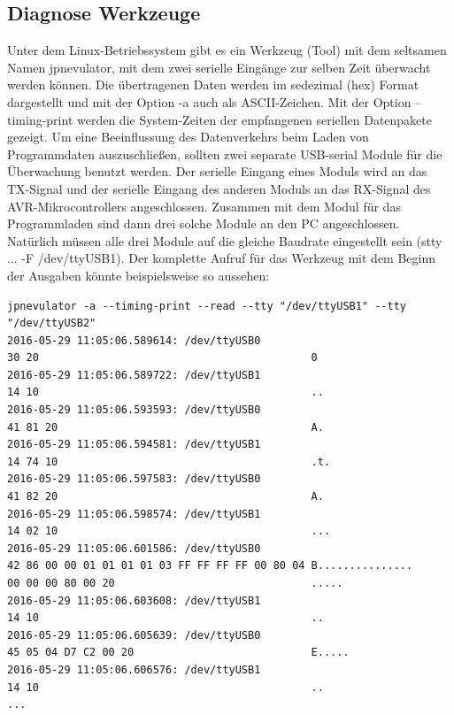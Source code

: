 \subsection{Diagnose Werkzeuge}
Unter dem Linux-Betriebssystem gibt es ein Werkzeug (Tool) mit dem seltsamen Namen jpnevulator, mit dem
zwei serielle Eingänge zur selben Zeit überwacht werden können.
Die übertragenen Daten werden im sedezimal (hex) Format dargestellt und mit der Option -a auch als ASCII-Zeichen.
Mit der Option --timing-print werden die System-Zeiten der empfangenen seriellen Datenpakete gezeigt.
Um eine Beeinflussung des Datenverkehrs beim Laden von Programmdaten auszuschließen, sollten
zwei separate USB-serial Module für die Überwachung benutzt werden.
Der serielle Eingang eines Moduls wird an das TX-Signal und der serielle Eingang des anderen Moduls
an das RX-Signal des AVR-Mikrocontrollers angeschlossen.
Zusammen mit dem Modul für das Programmladen sind dann drei solche Module an den PC angeschlossen.
Natürlich müssen alle drei Module auf die gleiche Baudrate eingestellt sein (stty ... -F /dev/ttyUSB1).
Der komplette Aufruf für das Werkzeug mit dem Beginn der Ausgaben könnte beispielsweise so aussehen:
\begin{verbatim}
jpnevulator -a --timing-print --read --tty "/dev/ttyUSB1" --tty "/dev/ttyUSB2"
2016-05-29 11:05:06.589614: /dev/ttyUSB0
30 20                                           0
2016-05-29 11:05:06.589722: /dev/ttyUSB1
14 10                                           ..
2016-05-29 11:05:06.593593: /dev/ttyUSB0
41 81 20                                        A.
2016-05-29 11:05:06.594581: /dev/ttyUSB1
14 74 10                                        .t.
2016-05-29 11:05:06.597583: /dev/ttyUSB0
41 82 20                                        A.
2016-05-29 11:05:06.598574: /dev/ttyUSB1
14 02 10                                        ...
2016-05-29 11:05:06.601586: /dev/ttyUSB0
42 86 00 00 01 01 01 01 03 FF FF FF FF 00 80 04 B...............
00 00 00 80 00 20                               .....
2016-05-29 11:05:06.603608: /dev/ttyUSB1
14 10                                           ..
2016-05-29 11:05:06.605639: /dev/ttyUSB0
45 05 04 D7 C2 00 20                            E.....
2016-05-29 11:05:06.606576: /dev/ttyUSB1
14 10                                           ..
...
\end{verbatim}
